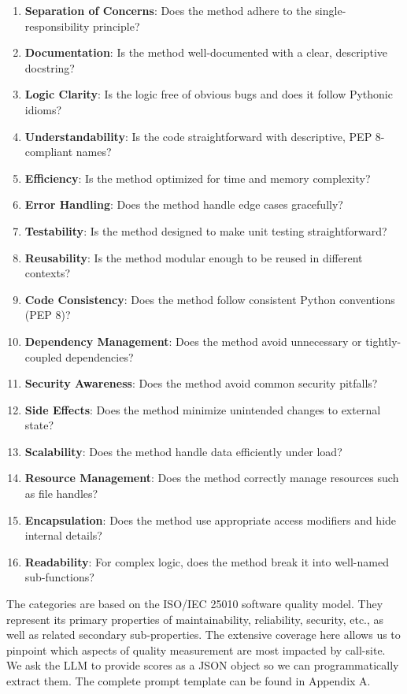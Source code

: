 \documentclass[12pt]{report}
\begin{document}
\begin{enumerate}
    \item \textbf{Separation of Concerns}: Does the method adhere to the single-responsibility principle?
    \item \textbf{Documentation}: Is the method well-documented with a clear, descriptive docstring?
    \item \textbf{Logic Clarity}: Is the logic free of obvious bugs and does it follow Pythonic idioms?
    \item \textbf{Understandability}: Is the code straightforward with descriptive, PEP 8-compliant names?
    \item \textbf{Efficiency}: Is the method optimized for time and memory complexity?
    \item \textbf{Error Handling}: Does the method handle edge cases gracefully?
    \item \textbf{Testability}: Is the method designed to make unit testing straightforward?
    \item \textbf{Reusability}: Is the method modular enough to be reused in different contexts?
    \item \textbf{Code Consistency}: Does the method follow consistent Python conventions (PEP 8)?
    \item \textbf{Dependency Management}: Does the method avoid unnecessary or tightly-coupled dependencies?
    \item \textbf{Security Awareness}: Does the method avoid common security pitfalls?
    \item \textbf{Side Effects}: Does the method minimize unintended changes to external state?
    \item \textbf{Scalability}: Does the method handle data efficiently under load?
    \item \textbf{Resource Management}: Does the method correctly manage resources such as file handles?
    \item \textbf{Encapsulation}: Does the method use appropriate access modifiers and hide internal details?
    \item \textbf{Readability}: For complex logic, does the method break it into well-named sub-functions?
\end{enumerate}

The categories are based on the ISO/IEC 25010 software quality model. They represent its primary properties of maintainability, reliability, security, etc., as well as related secondary sub-properties. The extensive coverage here allows us to pinpoint which aspects of quality measurement are most impacted by call-site. We ask the LLM to provide scores as a JSON object so we can programmatically extract them. The complete prompt template can be found in Appendix A.
\end{document}
